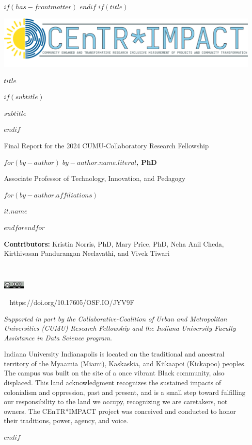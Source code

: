 $if(has-frontmatter)$
\frontmatter
$endif$
$if(title)$
\cleardoublepage
\thispagestyle{empty}
{\centering
\includegraphics[width=6in]{assets/images/centr-impact-logo.png}
{\Huge\sffamily\bfseries $title$ \par}
$if(subtitle)$
\vspace{3ex}
{\Large\sffamily\bfseries $subtitle$ \par}
$endif$
\vspace{1ex}
{\large Final Report for the 2024 CUMU-Collaboratory Research Fellowship \par}
\vspace{12ex}
$for(by-author)$
{\Large\bfseries $by-author.name.literal$, PhD  \\}
{Associate Professor of Technology, Innovation, and Pedagogy \par}
$for(by-author.affiliations)$%
{$it.name$ \par}
$endfor$$endfor$
{\textbf{Contributors:} Kristin Norris, PhD, Mary Price, PhD, Neha Anil Cheda, Kirthivasan Pandurangan Neelavathi, and Vivek Tiwari \par}
\vfill
{\textcolor{iucolor}{\aiOpenData} ~ ~ \textcolor{orange}{\aiOpenAccess} ~ ~ \textcolor{osfcolor}{\aiOSF} ~ ~ {\includegraphics[height=11pt]{assets/images/By-SA} \par}
{\textcolor{doicolor}{\aiDoi} ~ https://doi.org/10.17605/OSF.IO/JYV9F \par}
\vfill
{\small\textit{Supported in part by the Collaborative-Coalition of Urban and Metropolitan Universities (CUMU) Research Fellowship and the Indiana University Faculty Assistance in Data Science program.} \par}
\newpage
\null
{}
\vfill
{Indiana University Indianapolis is located on the traditional and ancestral territory of the Myaamia (Miami), Kaskaskia, and Kiikaapoi (Kickapoo) peoples. The campus was built on the site of a once vibrant Black community, also displaced. This land acknowledgment recognizes the sustained impacts of colonialism and oppression, past and present, and is a small step toward fulfilling our responsibility to the land we occupy, recognizing we are caretakers, not owners. The CEnTR*IMPACT project was conceived and conducted to honor their traditions, power, agency, and voice. \par}
}}
$endif$